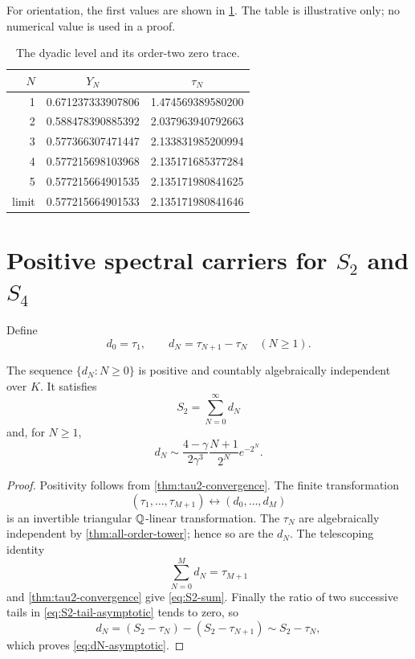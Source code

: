For orientation, the first values are shown in \cref{tab:dyadic-values}.
The table is illustrative only; no numerical value is used in a proof.

\begin{table}[ht]
\centering
\caption{The dyadic level and its order-two zero trace.}
\label{tab:dyadic-values}
\begin{tabular}{@{}rcc@{}}
\toprule
\(N\)&\(Y_N\)&\(\tau_N\)\\
\midrule
1&0.671237333907806&1.474569389580200\\
2&0.588478390885392&2.037963940792663\\
3&0.577366307471447&2.133831985200994\\
4&0.577215698103968&2.135171685377284\\
5&0.577215664901535&2.135171980841625\\
\midrule
limit&0.577215664901533&2.135171980841646\\
\bottomrule
\end{tabular}
\end{table}

\section{Positive spectral carriers for
\texorpdfstring{\(S_2\) and \(S_4\)}{S2 and S4}}
\label{sec:spectral}

Define
\begin{equation}\label{eq:dN-def}
 d_0=\tau_1,
 \qquad
 d_N=\tau_{N+1}-\tau_N\quad(N\ge1).
\end{equation}

\begin{theorem}
\label{thm:increments}
The sequence \(\{d_N:N\ge0\}\) is positive and countably algebraically
independent over \(K\).  It satisfies
\begin{equation}\label{eq:S2-sum}
 \boxed{\displaystyle S_2=\sum_{N=0}^\infty d_N}
\end{equation}
and, for \(N\ge1\),
\begin{equation}\label{eq:dN-asymptotic}
 d_N\sim
 \frac{4-\gamma}{2\gamma^3}
 \frac{N+1}{2^N}e^{-2^N}.
\end{equation}
\end{theorem}

\begin{proof}
Positivity follows from \cref{thm:tau2-convergence}.  The finite
transformation
\[
 (\tau_1,\ldots,\tau_{M+1})
 \longleftrightarrow(d_0,\ldots,d_M)
\]
is an invertible triangular \(\mathbb Q\)-linear transformation.  The
\(\tau_N\) are algebraically independent by
\cref{thm:all-order-tower}; hence so are the \(d_N\).  The telescoping
identity
\[
 \sum_{N=0}^Md_N=\tau_{M+1}
\]
and \cref{thm:tau2-convergence} give \eqref{eq:S2-sum}.  Finally the ratio
of two successive tails in \eqref{eq:S2-tail-asymptotic} tends to zero, so
\[
 d_N=(S_2-\tau_N)-(S_2-\tau_{N+1})\sim S_2-\tau_N,
\]
which proves \eqref{eq:dN-asymptotic}.
\end{proof}

